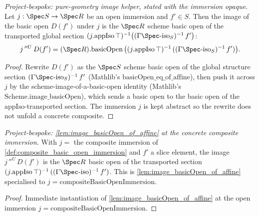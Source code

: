 \begin{lemma}
  \label{lem:image_basicOpen_of_affine}
  \textit{Project-bespoke: pure-geometry image helper, stated with the immersion opaque.}
  Let \(j : \Spec S \to \Spec R\) be an open immersion and \(f' \in S\). Then the image of the basic
  open \(D(f')\) under \(j\) is the \(\Spec R\) scheme basic open of the transported global section
  \((j.\mathrm{appIso}\,\top)^{-1}\bigl((\Gamma\Spec\text{-iso}_S)^{-1}\,f'\bigr)\):
  \[
    j\,''^{U}\,D(f') = (\Spec R).\mathrm{basicOpen}\,
      \bigl((j.\mathrm{appIso}\,\top)^{-1}\,((\Gamma\Spec\text{-iso}_S)^{-1}\,f')\bigr).
  \]
\end{lemma}
\begin{proof}
  Rewrite \(D(f')\) as the \(\Spec S\) scheme basic open of the global structure section
  \((\Gamma\Spec\text{-iso}_S)^{-1}\,f'\) (Mathlib's \(\mathrm{basicOpen\_eq\_of\_affine}\)), then push
  it across \(j\) by the scheme-image-of-a-basic-open identity (Mathlib's
  \(\mathrm{Scheme.image\_basicOpen}\)), which sends a basic open to the basic open of the
  \(\mathrm{appIso}\)-transported section. The immersion \(j\) is kept abstract so the rewrite does not
  unfold a concrete composite.
\end{proof}

\begin{lemma}
  \label{lem:compositeBasicOpenImmersion_image_basicOpen}
  \textit{Project-bespoke: \cref{lem:image_basicOpen_of_affine} at the concrete composite immersion.}
  With \(j = \) the composite immersion of \cref{def:composite_basic_open_immersion} and \(f'\) a slice
  element, the image \(j\,''^{U}\,D(f')\) is the \(\Spec R\) basic open of the transported section
  \((j.\mathrm{appIso}\,\top)^{-1}\,((\Gamma\Spec\text{-iso})^{-1}\,f')\). This is
  \cref{lem:image_basicOpen_of_affine} specialised to \(j = \mathrm{compositeBasicOpenImmersion}\).
\end{lemma}
\begin{proof}
  Immediate instantiation of \cref{lem:image_basicOpen_of_affine} at the open immersion
  \(j = \mathrm{compositeBasicOpenImmersion}\).
\end{proof}

